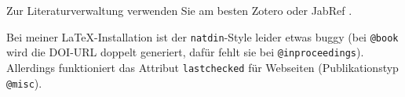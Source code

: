 \documentclass[12pt,oneside]{article}
\begin{document}
  Zur Literaturverwaltung verwenden Sie am besten Zotero \cite{zotero} oder JabRef \cite{jabref}. 
  
  Bei meiner \LaTeX-Installation ist der \texttt{natdin}-Style leider etwas buggy (bei \texttt{@book} wird die DOI-URL doppelt generiert, dafür fehlt sie bei \texttt{@inproceedings}). Allerdings funktioniert das
  Attribut \texttt{lastchecked} für Webseiten (Publikationstyp \texttt{@misc}).
  
  \clearpage %
  

  
  
  

\end{document}
